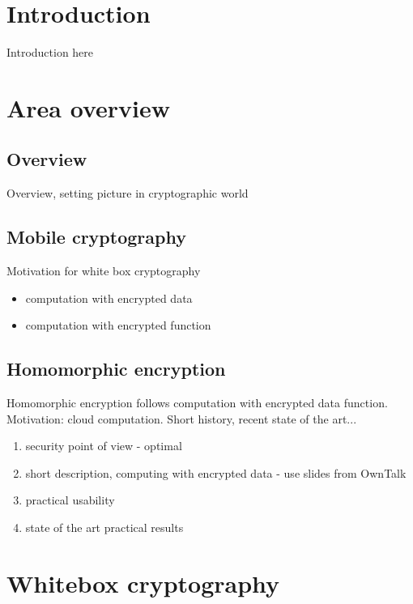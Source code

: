 \documentclass[11pt,oneside,final]{fithesis2}
\begin{document}

\chapter{Introduction}
Introduction here

\chapter{Area overview}\label{sec:theory}
    
    \section{Overview}
    Overview, setting picture in cryptographic world

    \section{Mobile cryptography}
    Motivation for white box cryptography
    \begin{itemize}
     \item computation with encrypted data
     \item computation with encrypted function
    \end{itemize}


    \section{Homomorphic encryption}
    Homomorphic encryption follows computation with encrypted data function.
    Motivation: cloud computation. Short history, recent state of the art...
    
    \begin{enumerate}
     \item security point of view - optimal
     \item short description, computing with encrypted data - use slides from OwnTalk
     \item practical usability
     \item state of the art practical results
    \end{enumerate}

\chapter{Whitebox cryptography}
    
\end{document}
